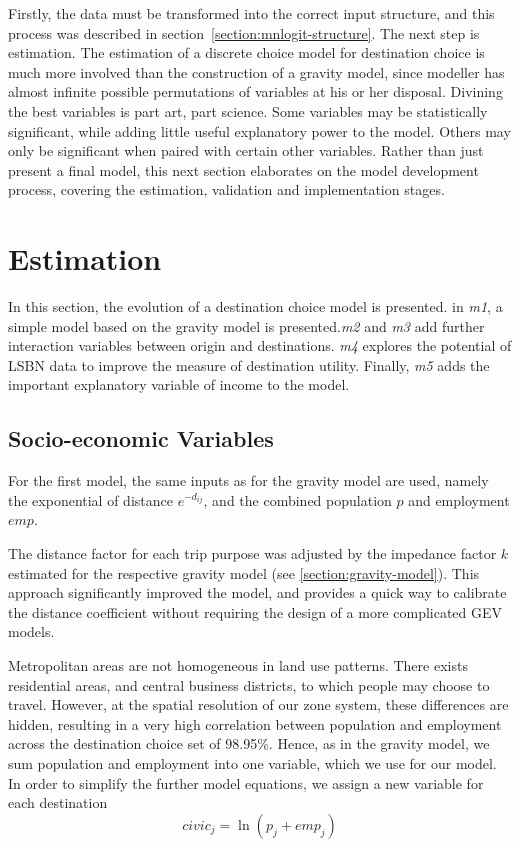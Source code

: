 Firstly, the data must be transformed into the correct input structure, and this process was described in section~\ref{section:mnlogit-structure}. The next step is estimation. The estimation of a discrete choice model for destination choice is much more involved than the construction of a gravity model, since modeller has almost infinite possible permutations of variables at his or her disposal. Divining the best variables is part art, part science. Some variables may be statistically significant, while adding little useful explanatory power to the model. Others may only be significant when paired with certain other variables. Rather than just present a final model, this next section elaborates on the model development process, covering the estimation, validation and implementation stages.

\section{Estimation}
In this section, the evolution of a destination choice model is presented. in \textit{m1}, a simple model based on the gravity model is presented.\textit{m2} and \textit{m3} add further interaction variables between origin and destinations. \textit{m4} explores the potential of LSBN data to improve the measure of destination utility. Finally, \textit{m5} adds the important explanatory variable of income to the model.

\subsection{Socio-economic Variables}
For the first model, the same inputs as for the gravity model are used, namely the exponential of distance $e^{-d_{ij}}$, and the combined population $p$ and employment $emp$.

The distance factor for each trip purpose was adjusted by the impedance factor $k$ estimated for the respective gravity model (see \ref{section:gravity-model}). This approach significantly improved the model, and provides a quick way to calibrate the distance coefficient without requiring the design of a more complicated GEV models.

Metropolitan areas are not homogeneous in land use patterns. There exists residential areas, and central business districts, to which people may choose to travel. However, at the spatial resolution of our zone system, these differences are hidden, resulting in a very high correlation between population and employment across the destination choice set of 98.95\%. Hence, as in the gravity model, we sum population and employment into one variable, which we use for our model. In order to simplify the further model equations, we assign a new variable for each destination
$$ civic_j = \ln\left( p_j + emp_j \right) $$

